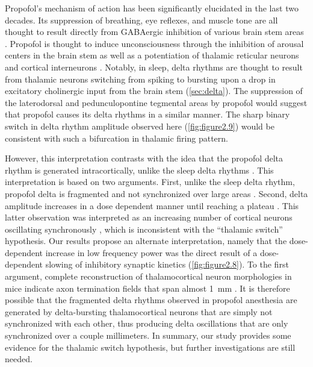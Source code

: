 Propofol's mechanism of action has been significantly elucidated in the last two decades. Its suppression of breathing, eye reflexes, and muscle tone are all thought to result directly from GABAergic inhibition of various brain stem areas \cite{Brown2011}. Propofol is thought to induce unconsciousness through the inhibition of arousal centers in the brain stem as well as a potentiation of thalamic reticular neurons and cortical interneurons \cite{Brown2011}. Notably, in sleep, delta rhythms are thought to result from thalamic neurons switching from spiking to bursting upon a drop in excitatory cholinergic input from the brain stem (\autoref{sec:delta}). The suppression of the laterodorsal and pedunculopontine tegmental areas by propofol \cite{Brown2011} would suggest that propofol causes its delta rhythms in a similar manner. The sharp binary switch in delta rhythm amplitude observed here (\autoref{fig:figure2.9}) would be consistent with such a bifurcation in thalamic firing pattern. 

However, this interpretation contrasts with the idea that the propofol delta rhythm is generated intracortically, unlike the sleep delta rhythms \cite{Akeju2017d}. This interpretation is based on two arguments. First, unlike the sleep delta rhythm, propofol delta is fragmented and not synchronized over large areas \cite{Akeju2017d,Lewis2012}. Second, delta amplitude increases in a dose dependent manner until reaching a plateau \cite{Akeju2017d,NiMhuircheartaigh2013}. This latter observation was interpreted as an increasing number of cortical neurons oscillating synchronously \cite{NiMhuircheartaigh2013}, which is inconsistent with the ``thalamic switch'' hypothesis. Our results propose an alternate interpretation, namely that the dose-dependent increase in low frequency power was the direct result of a dose-dependent slowing of inhibitory synaptic kinetics (\autoref{fig:figure2.8}). To the first argument, complete reconstruction of thalamocortical neuron morphologies in mice indicate axon termination fields that span almost \qty{1}{\milli\meter} \cite{Winnubst2019}. It is therefore possible that the fragmented delta rhythms observed in propofol anesthesia are generated by delta-bursting thalamocortical neurons that are simply not synchronized with each other, thus producing delta oscillations that are only synchronized over a couple millimeters. In summary, our study provides some evidence for the thalamic switch hypothesis, but further investigations are still needed.

